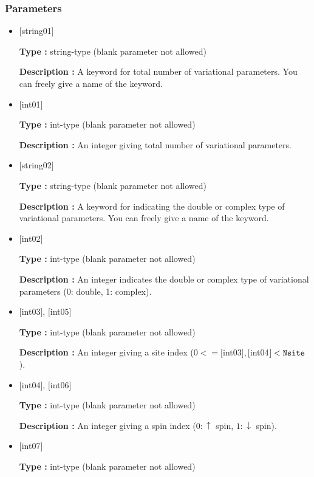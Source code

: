 \subsubsection{Parameters}
 \begin{itemize}

   \item  $[$string01$]$
   
    {\bf Type :} string-type (blank parameter not allowed)

   {\bf Description :}  A keyword for total number of variational parameters. You can freely give a name of the keyword. 

   \item  $[$int01$]$
   
    {\bf Type :} int-type (blank parameter not allowed)

   {\bf Description :} An integer giving total number of variational parameters. 

   \item  $[$string02$]$
   
    {\bf Type :} string-type (blank parameter not allowed)

   {\bf Description :} A keyword for indicating the double or complex type of variational parameters. You can freely give a name of the keyword.
   
   \item  $[$int02$]$
   
    {\bf Type :} int-type (blank parameter not allowed)

   {\bf Description :} An integer indicates the double or complex type of variational parameters (0: double, 1: complex). 

  \item  $[$int03$]$, $[$int05$]$
   
 {\bf Type :} int-type (blank parameter not allowed)

{\bf Description :} An integer giving a site index ($0<= [$int03$], [$int04$] <\verb|Nsite|$).

  \item  $[$int04$]$, $[$int06$]$
   
 {\bf Type :} int-type (blank parameter not allowed)

{\bf Description :} An integer giving a spin index ($0:\uparrow$ spin, $1:\downarrow$ spin).
 
 \item  $[$int07$]$
   
   {\bf Type :} int-type (blank parameter not allowed)


\end{itemize}
